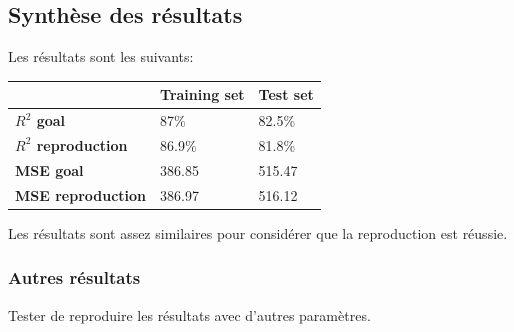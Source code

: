 \subsection{Synthèse des résultats}
Les résultats sont les suivants:
\begin{table}[h]
    \centering
    \begin{tabular}{l|l|l|}
    \cline{2-3}
                                                    & \textbf{Training set} & \textbf{Test set} \\ \hline
    \multicolumn{1}{|l|}{\textbf{$R^2$ goal}}          & 87\%                  & 82.5\%            \\ \hline
    \multicolumn{1}{|l|}{\textbf{$R^2$ reproduction}}  & 86.9\%                & 81.8\%            \\ \hline
    \multicolumn{1}{|l|}{\textbf{MSE goal}}         & 386.85                & 515.47            \\ \hline
    \multicolumn{1}{|l|}{\textbf{MSE reproduction}} & 386.97                & 516.12            \\ \hline
    \end{tabular}
\end{table}
Les résultats sont assez similaires pour considérer que la reproduction est réussie.


\subsubsection{Autres résultats}
Tester de reproduire les résultats avec d'autres paramètres.
